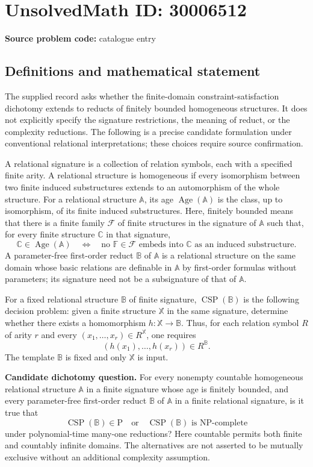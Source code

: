 \documentclass[11pt]{article}
\begin{document}
\section*{UnsolvedMath ID: 30006512}
\textbf{Source problem code:} catalogue entry
\subsection{Definitions and mathematical statement}
The supplied record asks whether the finite-domain constraint-satisfaction dichotomy extends to reducts of finitely bounded homogeneous structures. It does not explicitly specify the signature restrictions, the meaning of reduct, or the complexity reductions. The following is a precise candidate formulation under conventional relational interpretations; these choices require source confirmation.

A relational signature is a collection of relation symbols, each with a specified finite arity. A relational structure is homogeneous if every isomorphism between two finite induced substructures extends to an automorphism of the whole structure. For a relational structure \(\mathbb A\), its age \(\operatorname{Age}(\mathbb A)\) is the class, up to isomorphism, of its finite induced substructures. Here, finitely bounded means that there is a finite family \(\mathcal F\) of finite structures in the signature of \(\mathbb A\) such that, for every finite structure \(\mathbb C\) in that signature,
\[
\mathbb C\in\operatorname{Age}(\mathbb A)
\quad\Longleftrightarrow\quad
\text{no }\mathbb F\in\mathcal F\text{ embeds into }\mathbb C
\text{ as an induced substructure}.
\]
A parameter-free first-order reduct \(\mathbb B\) of \(\mathbb A\) is a relational structure on the same domain whose basic relations are definable in \(\mathbb A\) by first-order formulas without parameters; its signature need not be a subsignature of that of \(\mathbb A\).

For a fixed relational structure \(\mathbb B\) of finite signature, \(\operatorname{CSP}(\mathbb B)\) is the following decision problem: given a finite structure \(\mathbb X\) in the same signature, determine whether there exists a homomorphism \(h:\mathbb X\to\mathbb B\). Thus, for each relation symbol \(R\) of arity \(r\) and every \((x_1,\ldots,x_r)\in R^{\mathbb X}\), one requires
\[
(h(x_1),\ldots,h(x_r))\in R^{\mathbb B}.
\]
The template \(\mathbb B\) is fixed and only \(\mathbb X\) is input.

\textbf{Candidate dichotomy question.} For every nonempty countable homogeneous relational structure \(\mathbb A\) in a finite signature whose age is finitely bounded, and every parameter-free first-order reduct \(\mathbb B\) of \(\mathbb A\) in a finite relational signature, is it true that
\[
\operatorname{CSP}(\mathbb B)\in\mathrm P
\quad\text{or}\quad
\operatorname{CSP}(\mathbb B)\text{ is }\mathrm{NP}\text{-complete}
\]
under polynomial-time many-one reductions? Here countable permits both finite and countably infinite domains. The alternatives are not asserted to be mutually exclusive without an additional complexity assumption.
\end{document}
